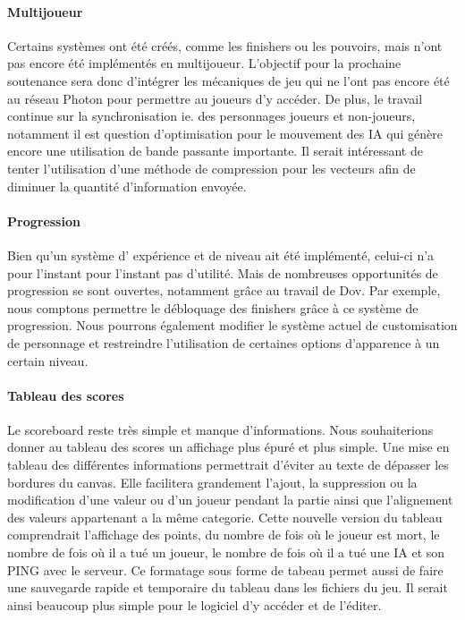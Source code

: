         \paragraph{Multijoueur}

            Certains systèmes ont été créés, comme les finishers ou les pouvoirs, mais n'ont pas encore été 
            implémentés en multijoueur. L'objectif pour la prochaine soutenance sera donc d'intégrer les mécaniques 
            de jeu qui ne l'ont pas encore été au réseau Photon pour permettre au joueurs d'y accéder. De plus, le 
            travail continue sur la synchronisation ie. des personnages joueurs et non-joueurs, notamment il est 
            question d'optimisation pour le mouvement des IA qui génère encore une utilisation de bande passante importante. 
            Il serait intéressant de tenter l'utilisation d'une méthode de compression pour les vecteurs afin de diminuer 
            la quantité d'information envoyée.


        \paragraph{Progression}

            Bien qu'un système d' expérience et de niveau ait été implémenté, celui-ci n'a pour l'instant pour 
            l'instant pas d'utilité. Mais de nombreuses opportunités de progression se sont ouvertes, 
            notamment grâce au travail de Dov. Par exemple, nous comptons permettre le débloquage des 
            finishers grâce à ce système de progression. Nous pourrons également modifier le système actuel 
            de customisation de personnage et restreindre l'utilisation de certaines options d'apparence à un certain niveau.


        \paragraph{Tableau des scores}

            Le scoreboard reste très simple et manque d’informations. Nous souhaiterions donner au tableau des scores un affichage plus épuré et plus simple. Une mise en tableau des différentes informations permettrait d’éviter au texte de dépasser les bordures du canvas. Elle facilitera grandement l’ajout, la suppression ou la modification d’une valeur ou d’un joueur pendant la partie ainsi que l’alignement des valeurs appartenant a la même categorie. 
            Cette nouvelle version du tableau comprendrait l'affichage des points, du nombre de fois où le joueur est mort, le nombre de fois où il a tué un joueur, le nombre de fois où il a tué une IA et son PING avec le serveur. Ce formatage sous forme de tabeau permet aussi de faire une sauvegarde rapide et temporaire du tableau dans les fichiers du jeu. Il serait ainsi beaucoup plus simple pour le logiciel d'y accéder et de l'éditer.
            
